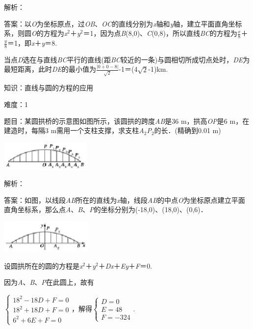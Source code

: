 \documentclass{article} %
\begin{document}
解析：

答案：以\textit{O}为坐标原点，过\textit{OB}、\textit{OC}的直线分别为\textit{x}轴和\textit{y}轴，建立平面直角坐标系，则圆\textit{O}的方程为\textit{x}${}^{2}$＋\textit{y}${}^{2}$＝1，因为点\textit{B}(8,0)、\textit{C}(0,8)，所以直线\textit{BC}的方程为$\frac{x}{8}$＋$\frac{y}{8}$＝1，即\textit{x}＋\textit{y}＝8.

当点\textit{D}选在与直线\textit{BC}平行的直线(距\textit{BC}较近的一条)与圆相切所成切点处时，\textit{DE}为最短距离，此时\textit{DE}的最小值为$\frac{|0+0-8|}{\sqrt{2}}$-1＝(4$\sqrt{2}$-1)km.

知识：直线与圆的方程的应用

难度：1

题目：某圆拱桥的示意图如图所示，该圆拱的跨度\textit{AB}是36 m，拱高\textit{OP}是6 m，在建造时，每隔3 m需用一个支柱支撑，求支柱\textit{A}${}_{2}$\textit{P}${}_{2}$的长．(精确到0.01 m)

\includegraphics*[width=1.78in, height=0.58in, keepaspectratio=false]{image303}

解析：

答案：如图，以线段\textit{AB}所在的直线为\textit{x}轴，线段\textit{AB}的中点\textit{O}为坐标原点建立平面直角坐标系，那么点\textit{A}、\textit{B}、\textit{P}的坐标分别为(-18,0)、(18,0)、(0,6)．

\includegraphics*[width=1.79in, height=0.65in, keepaspectratio=false]{image304}

设圆拱所在的圆的方程是\textit{x}${}^{2}$＋\textit{y}${}^{2}$＋\textit{Dx}＋\textit{Ey}＋\textit{F}＝0.

因为\textit{A}、\textit{B}、\textit{P}在此圆上，故有

$\left\{\begin{array}{r} 18^2-18D+F=0\\ 18^2+18D+F=0\\ 6^2+6E+F=0 \end{array} \right.$，解得$\left\{\begin{array}{r} D=0\\ E=48\\ F=-324 \end{array} \right.$.
\end{document}
